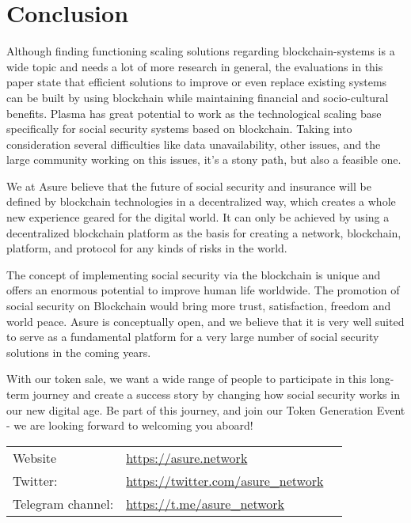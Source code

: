 \section*{Conclusion}

Although finding functioning scaling solutions regarding blockchain-systems is a wide topic and needs a lot of more research in general, the evaluations in this paper state that efficient solutions to improve or even replace existing systems can be built by using blockchain while maintaining financial and socio-cultural benefits.
Plasma has great potential to work as the technological scaling base specifically for social security systems based on blockchain. Taking into consideration several difficulties like data unavailability, other issues, and the large community working on this issues, it’s a stony path, but also a feasible one.
\newline

We at Asure believe that the future of social security and insurance will be defined by blockchain technologies in a decentralized way, which creates a whole new experience geared for the digital world. It can only be achieved by using a decentralized blockchain platform as the basis for creating a network, blockchain, platform, and protocol for any kinds of risks in the world. 
\newline

The concept of implementing social security via the blockchain is unique and offers an enormous potential to improve human life worldwide. The promotion of social security on Blockchain would bring more trust, satisfaction, freedom and world peace. Asure is conceptually open, and we believe that it is very well suited to serve as a fundamental platform for a very large number of social security solutions in the coming years.
\newline

With our token sale, we want a wide range of people to participate in this long-term journey and create a success story by changing how social security works in our new digital age. Be part of this journey, and join our Token Generation Event - we are looking forward to welcoming you aboard!
\newline\newline

\begin{table}[H]
\begin{tabular}{lp{}l}
  Website & \url{https://asure.network}\\
  Twitter: & \url{https://twitter.com/asure_network}\\
  Telegram channel: & \url{https://t.me/asure_network}
\end{tabular}
\end{table} 